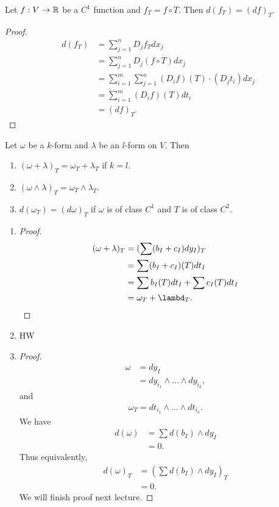 \documentclass[11pt]{article}
\begin{document}
\begin{lemma} Let $f: V \to \mathbb{R}$ be a $C^1$ function and $f_T = f \circ T$. Then $d(f_T) = (df)_T$. 
\end{lemma}
\begin{proof} \begin{align*} d(f_T) & = \sum_{j = 1}^n D_j f_T  dx_j \\ & = \sum_{j = 1}^n D_j (f \circ T) dx_j \\ & = \sum_{i = 1}^m \sum_{j = 1}^n (D_i f)(T) \cdot (D_j t_i) dx_j \\ & = \sum_{i = 1}^m (D_i f) (T) dt_i \\ & = (df)_T.
\end{align*}
\end{proof}

\begin{theorem} Let $\omega$ be a $k$-form and $\lambda$ be an $l$-form on $V$. Then \begin{enumerate}
  \item $(\omega + \lambda)_T = \omega_T + \lambda_T$ if $k = l$.
  \item $(\omega \wedge \lambda)_T = \omega_T \wedge \lambda_T$.
    \item $d (\omega_T) = (d \omega)_T$ if $\omega$ is of class $C^1$ and $T$ is of class $C^2$. 
  \end{enumerate}
\end{theorem}
\begin{enumerate}
    \item \begin{proof} \begin{align*} (\omega + \lambda)_T & = ( \sum (b_I + c_I) dy_I)_T \\ & = \sum (b_I + c_I) (T) dt_I \\ & = \sum b_I (T) dt_I + \sum c_I (T) dt_I \\ & = \omega_T + \lambd_T.
    \end{align*}
      \end{proof}
  \item HW
    \item \begin{proof} \begin{align*} \omega & = dy_I \\ & = dy_{i_1} \wedge \dots \wedge dy_{i_k} ,
    \end{align*} and \begin{align*} \omega_T = dt_{i_1} \wedge \dots \wedge dt_{i_k}.
    \end{align*} We have \begin{align*} d(\omega) & = \sum d(b_I) \wedge dy_I \\ & = 0.
    \end{align*} Thus equivalently, \begin{align*} d(\omega)_T & = \left( \sum d(b_I) \wedge dy_I \right)_T \\ & = 0.
    \end{align*} We will finish proof next lecture.
      \end{proof}
\end{enumerate}
\end{document}
